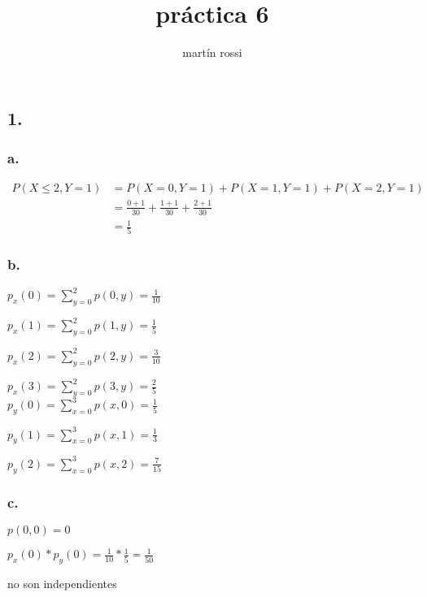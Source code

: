 \documentclass[12pt,fleqn]{article}
\title{práctica 6}
\author{martín rossi}
\date{}
\begin{document}
\maketitle
\subsection*{1.}
\subsubsection*{a.}
\begin{align*}
  P(X\le 2,Y=1)&=P(X=0,Y=1)+P(X=1,Y=1)+P(X=2,Y=1)\\
               &=\frac{0+1}{30}+\frac{1+1}{30}+\frac{2+1}{30}\\
               &=\frac{1}{5}
\end{align*}
\subsubsection*{b.}

$p_x(0)=\sum_{y=0}^2 p(0,y)=\frac{1}{10}$

$p_x(1)=\sum_{y=0}^2 p(1,y)=\frac{1}{5}$

$p_x(2)=\sum_{y=0}^2 p(2,y)=\frac{3}{10}$

$p_x(3)=\sum_{y=0}^2 p(3,y)=\frac{2}{5}$\\

$p_y(0)=\sum_{x=0}^3 p(x,0)=\frac{1}{5}$

$p_y(1)=\sum_{x=0}^3 p(x,1)=\frac{1}{3}$

$p_y(2)=\sum_{x=0}^3 p(x,2)=\frac{7}{15}$
\subsubsection*{c.}

$p(0,0)=0$

$p_x(0)*p_y(0)=\frac{1}{10}*\frac{1}{5}=\frac{1}{50}$

no son independientes
\end{document}
